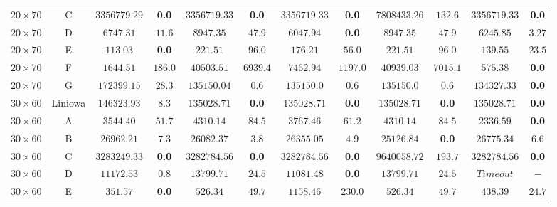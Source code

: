 \begin{table}[H]
\begin{center}
{\begin{tabular}{c|c||c|c||c|c||c|c||c|c||c|c}
            $20 \times 70$ & C           & $3356779.29$ & \textbf{0.0}                  & $3356719.33$ & \textbf{0.0}       & $3356719.33$ & \textbf{0.0}      & $7808433.26$ & $132.6$    & $3356719.33$ & \textbf{0.0} \\
            $20 \times 70$ & D           & $6747.31$ & $11.6$                    & $8947.35$ & $47.9$         & $6047.94$ & \textbf{0.0}         & $8947.35$ & $47.9$        & $6245.85$ & $3.27$ \\
            $20 \times 70$ & E           & $113.03$ & \textbf{0.0}                      & $221.51$ & $96.0$          & $176.21$ & $56.0$         & $221.51$ & $96.0$         & $139.55$ & $23.5$ \\
            $20 \times 70$ & F           & $1644.51$ & $186.0$                   & $40503.51$ & $6939.4$      & $7462.94$ & $1197.0$      & $40939.03$ & $7015.1$     & $575.38$ & \textbf{0.0} \\
            $20 \times 70$ & G           & $172399.15$ & $28.3$                  & $135150.04$ & $0.6$        & $135150.0$ & $0.6$        & $135150.0$ & $0.6$        & $134327.33$ & \textbf{0.0} \\
            \hline
            $30 \times 60$ & Liniowa     & $146323.93$ & $8.3$                   & $135028.71$ & \textbf{0.0}        & $135028.71$ & \textbf{0.0}       & $135028.71$ & \textbf{0.0}       & $135028.71$ & \textbf{0.0} \\
            $30 \times 60$ & A           & $3544.40$ & $51.7$                    & $4310.14$ & $84.5$         & $3767.46$ & $61.2$        & $4310.14$ & $84.5$        & $2336.59$ & \textbf{0.0} \\
            $30 \times 60$ & B           & $26962.21$ & $7.3$                    & $26082.37$ & $3.8$         & $26355.05$ & $4.9$        & $25126.84$ & \textbf{0.0}        & $26775.34$ & $6.6$ \\
            $30 \times 60$ & C           & $3283249.33$ & \textbf{0.0}                  & $3282784.56$ & \textbf{0.0}       & $3282784.56$ & \textbf{0.0}      & $9640058.72$ & $193.7$    & $3282784.56$ & \textbf{0.0} \\
            $30 \times 60$ & D           & $11172.53$ & $0.8$                    & $13799.71$ & $24.5$        & $11081.48$ & \textbf{0.0}        & $13799.71$ & $24.5$       & $Time out$ & $-$ \\
            $30 \times 60$ & E           & $351.57$ & \textbf{0.0}                      & $526.34$ & $49.7$          & $1158.46$ & $230.0$       & $526.34$ & $49.7$         & $438.39$ & $24.7$ \\

\end{tabular}}
\end{center}
\end{table}
